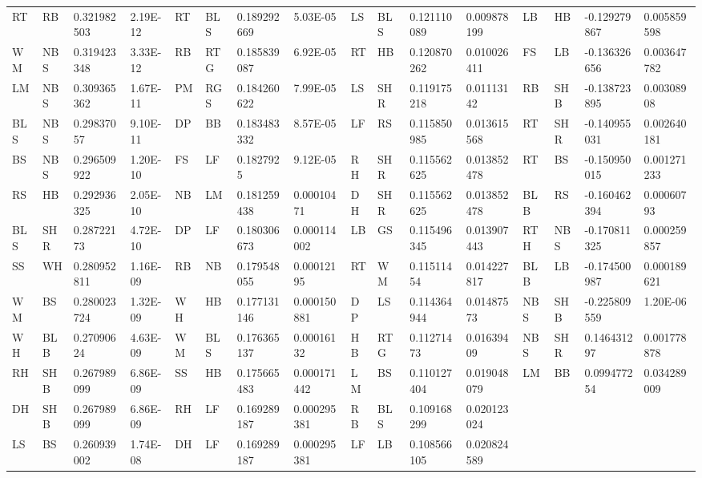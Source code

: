 \begin{table}[]
\begin{tabular}{llllllllllllllll}
RT  & RB     & 0.321982503 & 2.19E-12 & RT  & BLS    & 0.189292669 & 5.03E-05    & LS  & BLS    & 0.121110089 & 0.009878199 & LB  & HB     & -0.129279867 & 0.005859598 \\
WM  & NBS    & 0.319423348 & 3.33E-12 & RB  & RTG    & 0.185839087 & 6.92E-05    & RT  & HB     & 0.120870262 & 0.010026411 & FS  & LB     & -0.136326656 & 0.003647782 \\
LM  & NBS    & 0.309365362 & 1.67E-11 & PM  & RGS    & 0.184260622 & 7.99E-05    & LS  & SHR    & 0.119175218 & 0.01113142  & RB  & SHB    & -0.138723895 & 0.00308908  \\
BLS & NBS    & 0.29837057  & 9.10E-11 & DP  & BB     & 0.183483332 & 8.57E-05    & LF  & RS     & 0.115850985 & 0.013615568 & RT  & SHR    & -0.140955031 & 0.002640181 \\
BS  & NBS    & 0.296509922 & 1.20E-10 & FS  & LF     & 0.1827925   & 9.12E-05    & RH  & SHR    & 0.115562625 & 0.013852478 & RT  & BS     & -0.150950015 & 0.001271233 \\
RS  & HB     & 0.292936325 & 2.05E-10 & NB  & LM     & 0.181259438 & 0.00010471  & DH  & SHR    & 0.115562625 & 0.013852478 & BLB & RS     & -0.160462394 & 0.00060793  \\
BLS & SHR    & 0.28722173  & 4.72E-10 & DP  & LF     & 0.180306673 & 0.000114002 & LB  & GS     & 0.115496345 & 0.013907443 & RTH & NBS    & -0.170811325 & 0.000259857 \\
SS  & WH     & 0.280952811 & 1.16E-09 & RB  & NB     & 0.179548055 & 0.00012195  & RT  & WM     & 0.11511454  & 0.014227817 & BLB & LB     & -0.174500987 & 0.000189621 \\
WM  & BS     & 0.280023724 & 1.32E-09 & WH  & HB     & 0.177131146 & 0.000150881 & DP  & LS     & 0.114364944 & 0.01487573  & NBS & SHB    & -0.225809559 & 1.20E-06    \\
WH  & BLB    & 0.27090624  & 4.63E-09 & WM  & BLS    & 0.176365137 & 0.00016132  & HB  & RTG    & 0.11271473  & 0.01639409  & NBS & SHR    & 0.146431297  & 0.001778878 \\
RH  & SHB    & 0.267989099 & 6.86E-09 & SS  & HB     & 0.175665483 & 0.000171442 & LM  & BS     & 0.110127404 & 0.019048079 & LM  & BB     & 0.099477254  & 0.034289009 \\
DH  & SHB    & 0.267989099 & 6.86E-09 & RH  & LF     & 0.169289187 & 0.000295381 & RB  & BLS    & 0.109168299 & 0.020123024 &     &        &              &             \\
LS  & BS     & 0.260939002 & 1.74E-08 & DH  & LF     & 0.169289187 & 0.000295381 & LF  & LB     & 0.108566105 & 0.020824589 &     &        &              &             \\

\end{tabular}
\end{table}
